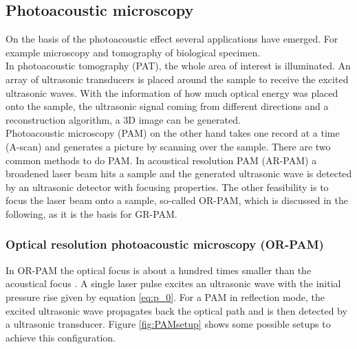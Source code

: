 \subsection{Photoacoustic microscopy}

On the basis of the photoacoustic effect several applications have emerged. For example microscopy and tomography of biological specimen. \\
In photoacoustic tomography (PAT), the whole area of interest is illuminated. An array of ultrasonic transducers is placed around the sample to receive the excited ultrasonic waves. With the information of how much optical energy was placed onto the sample, the ultrasonic signal coming from different directions and a reconstruction algorithm, a 3D image can be generated. \\
Photoacoustic microscopy (PAM) on the other hand takes one record at a time (A-scan) and generates a picture by scanning over the sample. There are two common methods to do PAM. In acoustical resolution PAM (AR-PAM) a broadened laser beam hits a sample and the generated ultrasonic wave is detected by an ultrasonic detector with focusing properties. The other feasibility is to focus the laser beam onto a sample, so-called OR-PAM, which is discussed in the following, as it is the basis for GR-PAM.

\subsubsection{Optical resolution photoacoustic microscopy (OR-PAM)}

In OR-PAM the optical focus is about a hundred times smaller than the acoustical focus \cite{YAO201487}. A single laser pulse excites an ultrasonic wave with the initial pressure rise given by equation \ref{eq:p_0}. For a PAM in reflection mode, the excited ultrasonic wave propagates back the optical path and is then detected by a ultrasonic transducer. Figure \ref{fig:PAMsetup} shows some possible setups to achieve this configuration. 


